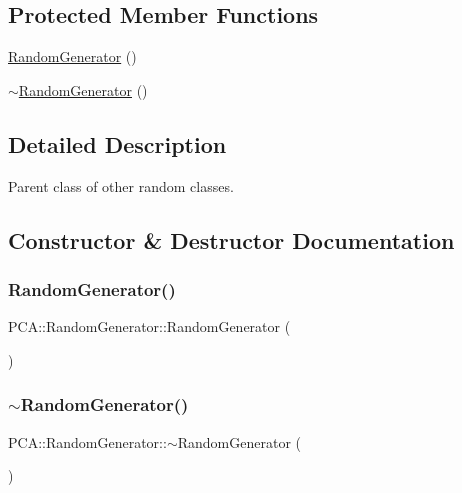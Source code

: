 \subsection*{Protected Member Functions}
\begin{DoxyCompactItemize}
\item 
\hyperlink{class_p_c_a_1_1_random_generator_a98ccf1f040a1f5dd0151f91537549cc0}{Random\+Generator} ()
\item 
\hyperlink{class_p_c_a_1_1_random_generator_a52e3af6bc9b825d1d4e8d463441ba6f7}{$\sim$\+Random\+Generator} ()
\end{DoxyCompactItemize}


\subsection{Detailed Description}
Parent class of other random classes. 

\subsection{Constructor \& Destructor Documentation}
\hypertarget{class_p_c_a_1_1_random_generator_a98ccf1f040a1f5dd0151f91537549cc0}{}\label{class_p_c_a_1_1_random_generator_a98ccf1f040a1f5dd0151f91537549cc0} 
\subsubsection{\texorpdfstring{Random\+Generator()}{RandomGenerator()}}
{\footnotesize\ttfamily P\+C\+A\+::\+Random\+Generator\+::\+Random\+Generator (\begin{DoxyParamCaption}{ }\end{DoxyParamCaption})\hspace{0.3cm}{\ttfamily [protected]}}

\hypertarget{class_p_c_a_1_1_random_generator_a52e3af6bc9b825d1d4e8d463441ba6f7}{}\label{class_p_c_a_1_1_random_generator_a52e3af6bc9b825d1d4e8d463441ba6f7} 
\subsubsection{\texorpdfstring{$\sim$\+Random\+Generator()}{~RandomGenerator()}}
{\footnotesize\ttfamily P\+C\+A\+::\+Random\+Generator\+::$\sim$\+Random\+Generator (\begin{DoxyParamCaption}{ }\end{DoxyParamCaption})\hspace{0.3cm}{\ttfamily [protected]}}



